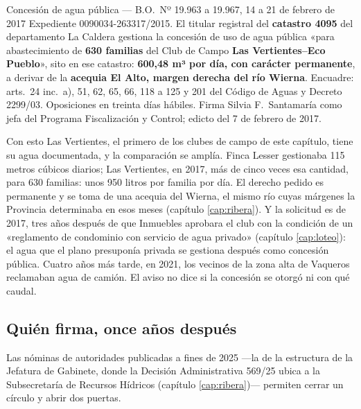 \begin{ficha}{Concesión de agua pública --- B.O.\ Nº 19.963 a 19.967, 14 a 21 de febrero de 2017}
Expediente 0090034-263317/2015. El titular registral del \textbf{catastro 4095} del departamento La Caldera gestiona la concesión de uso de agua pública «para abastecimiento de \textbf{630 familias} del Club de Campo \textbf{Las Vertientes--Eco Pueblo}», sito en ese catastro: \textbf{600,48 m³ por día, con carácter permanente}, a derivar de la \textbf{acequia El Alto, margen derecha del río Wierna}. Encuadre: arts.\ 24 inc.\ a), 51, 62, 65, 66, 118 a 125 y 201 del Código de Aguas y Decreto 2299/03. Oposiciones en treinta días hábiles. Firma Silvia F.\ Santamaría como jefa del Programa Fiscalización y Control; edicto del 7 de febrero de 2017.
\end{ficha}

\begin{cautela}
Con esto Las Vertientes, el primero de los clubes de campo de este capítulo, tiene su agua documentada, y la comparación se amplía. Finca Lesser gestionaba 115 metros cúbicos diarios; Las Vertientes, en 2017, más de cinco veces esa cantidad, para 630 familias: unos 950 litros por familia por día. El derecho pedido es permanente y se toma de una acequia del Wierna, el mismo río cuyas márgenes la Provincia determinaba en esos meses (capítulo \ref{cap:ribera}). Y la solicitud es de 2017, tres años después de que Inmuebles aprobara el club con la condición de un «reglamento de condominio con servicio de agua privado» (capítulo \ref{cap:loteo}): el agua que el plano presuponía privada se gestiona después como concesión pública. Cuatro años más tarde, en 2021, los vecinos de la zona alta de Vaqueros reclamaban agua de camión. El aviso no dice si la concesión se otorgó ni con qué caudal. 
\end{cautela}

\subsection*{Quién firma, once años después}

Las nóminas de autoridades publicadas a fines de 2025 ---la de la estructura de la Jefatura de Gabinete, donde la Decisión Administrativa 569/25 ubica a la Subsecretaría de Recursos Hídricos (capítulo \ref{cap:ribera})--- permiten cerrar un círculo y abrir dos puertas.

